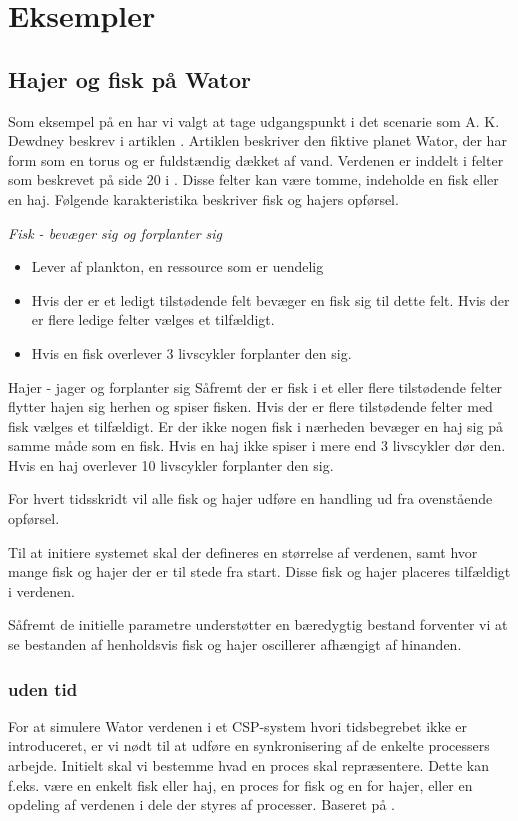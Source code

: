 \chapter{Eksempler}

\section{Hajer og fisk på Wator} Som eksempel på en \des har vi valgt at tage 
udgangspunkt i det scenarie som A. K. Dewdney
beskrev i artiklen \cite{wator}. Artiklen beskriver den
fiktive planet Wator, der har form som en torus og er fuldstændig
dækket af vand. Verdenen er inddelt i felter som beskrevet på side
20 i \cite{wator}. Disse felter kan være tomme, indeholde en
fisk eller en haj. Følgende karakteristika beskriver fisk og hajers
opførsel.


\emph{Fisk - bevæger sig og forplanter sig}
\begin{itemize}
\item Lever af plankton, en ressource som er uendelig
\item Hvis der er et ledigt tilstødende felt bevæger en fisk sig til dette 
  felt. Hvis der er flere ledige felter vælges et tilfældigt.  
\item Hvis en fisk overlever 3 livscykler forplanter den sig.
\end{itemize}

Hajer - jager og forplanter sig Såfremt der er fisk i et eller flere
tilstødende felter flytter hajen sig herhen og spiser fisken. Hvis der
er flere tilstødende felter med fisk vælges et tilfældigt. Er der
ikke nogen fisk i nærheden bevæger en haj sig på samme måde som en
fisk. Hvis en haj ikke spiser i mere end 3 livscykler dør den. Hvis en
haj overlever 10 livscykler forplanter den sig.

For hvert tidsskridt vil alle fisk og hajer udføre en handling ud fra
ovenstående opførsel.

Til at initiere systemet skal der defineres en størrelse af verdenen,
samt hvor mange fisk og hajer der er til stede fra start. Disse fisk og
hajer placeres tilfældigt i verdenen.

Såfremt de initielle parametre understøtter en bæredygtig bestand
forventer vi at se bestanden af henholdsvis fisk og hajer oscillerer
afhængigt af hinanden.


\subsection{uden tid}
For at simulere Wator verdenen i et CSP-system hvori tidsbegrebet ikke er 
introduceret, er vi nødt til at udføre en synkronisering af de enkelte 
processers arbejde. Initielt skal vi bestemme hvad en proces skal repræsentere.  
Dette kan f.eks. være en enkelt fisk eller haj, en proces for fisk og en for 
hajer, eller en opdeling af verdenen i dele der styres af processer.
Baseret på \cite{crew}. 





